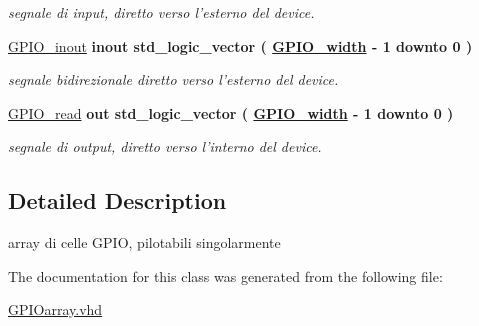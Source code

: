 \begin{DoxyCompactItemize}
\begin{DoxyCompactList}\small\item\em segnale di input, diretto verso l'esterno del device. \end{DoxyCompactList}\item 
\hypertarget{class_g_p_i_oarray_ga8829699d739ef35a4c5da396ffd38387}{\hyperlink{group__my_g_p_i_o_ga8829699d739ef35a4c5da396ffd38387}{G\+P\+I\+O\+\_\+inout}  {\bfseries {\bfseries \textcolor{vhdlchar}{inout}\textcolor{vhdlchar}{ }}} {\bfseries \textcolor{vhdlchar}{std\+\_\+logic\+\_\+vector}\textcolor{vhdlchar}{ }\textcolor{vhdlchar}{(}\textcolor{vhdlchar}{ }\textcolor{vhdlchar}{ }\textcolor{vhdlchar}{ }\textcolor{vhdlchar}{ }{\bfseries \hyperlink{group__my_g_p_i_o_ga0b52ca75e9a6093b2b60d5e851803069}{G\+P\+I\+O\+\_\+width}} \textcolor{vhdlchar}{-\/}\textcolor{vhdlchar}{ } \textcolor{vhdldigit}{1} \textcolor{vhdlchar}{ }\textcolor{vhdlchar}{downto}\textcolor{vhdlchar}{ }\textcolor{vhdlchar}{ } \textcolor{vhdldigit}{0} \textcolor{vhdlchar}{ }\textcolor{vhdlchar}{)}\textcolor{vhdlchar}{ }} }\label{class_g_p_i_oarray_ga8829699d739ef35a4c5da396ffd38387}

\begin{DoxyCompactList}\small\item\em segnale bidirezionale diretto verso l'esterno del device. \end{DoxyCompactList}\item 
\hypertarget{class_g_p_i_oarray_gafbe6792efd02cef42af7717592c1b04a}{\hyperlink{group__my_g_p_i_o_gafbe6792efd02cef42af7717592c1b04a}{G\+P\+I\+O\+\_\+read}  {\bfseries {\bfseries \textcolor{vhdlchar}{out}\textcolor{vhdlchar}{ }}} {\bfseries \textcolor{vhdlchar}{std\+\_\+logic\+\_\+vector}\textcolor{vhdlchar}{ }\textcolor{vhdlchar}{(}\textcolor{vhdlchar}{ }\textcolor{vhdlchar}{ }\textcolor{vhdlchar}{ }\textcolor{vhdlchar}{ }{\bfseries \hyperlink{group__my_g_p_i_o_ga0b52ca75e9a6093b2b60d5e851803069}{G\+P\+I\+O\+\_\+width}} \textcolor{vhdlchar}{-\/}\textcolor{vhdlchar}{ } \textcolor{vhdldigit}{1} \textcolor{vhdlchar}{ }\textcolor{vhdlchar}{downto}\textcolor{vhdlchar}{ }\textcolor{vhdlchar}{ } \textcolor{vhdldigit}{0} \textcolor{vhdlchar}{ }\textcolor{vhdlchar}{)}\textcolor{vhdlchar}{ }} }\label{class_g_p_i_oarray_gafbe6792efd02cef42af7717592c1b04a}

\begin{DoxyCompactList}\small\item\em segnale di output, diretto verso l'interno del device. \end{DoxyCompactList}\end{DoxyCompactItemize}


\subsection{Detailed Description}
array di celle G\+P\+I\+O, pilotabili singolarmente 

The documentation for this class was generated from the following file\+:\begin{DoxyCompactItemize}
\item 
\hyperlink{_g_p_i_oarray_8vhd}{G\+P\+I\+Oarray.\+vhd}\end{DoxyCompactItemize}
